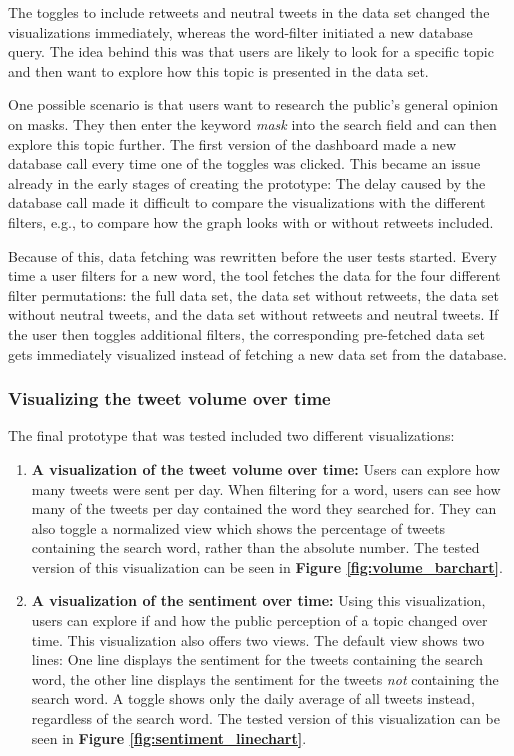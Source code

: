 The toggles to include retweets and neutral tweets in the data set changed the visualizations immediately, whereas the word-filter initiated a new database query. The idea behind this was that users are likely to look for a specific topic and then want to explore how this topic is presented in the data set.

One possible scenario is that users want to research the public's general opinion on masks. They then enter the keyword \emph{mask} into the search field and can then explore this topic further. The first version of the dashboard made a new database call every time one of the toggles was clicked. This became an issue already in the early stages of creating the prototype: The delay caused by the database call made it difficult to compare the visualizations with the different filters, e.g., to compare how the graph looks with or without retweets included.

Because of this, data fetching was rewritten before the user tests started. Every time a user filters for a new word, the tool fetches the data for the four different filter permutations: the full data set, the data set without retweets, the data set without neutral tweets, and the data set without retweets and neutral tweets. If the user then toggles additional filters, the corresponding pre-fetched data set gets immediately visualized instead of fetching a new data set from the database.

\subsubsection{Visualizing the tweet volume over time}
The final prototype that was tested included two different visualizations:

\begin{enumerate}
    \item \textbf{A visualization of the tweet volume over time:} Users can explore how many tweets were sent per day. When filtering for a word, users can see how many of the tweets per day contained the word they searched for. They can also toggle a normalized view which shows the percentage of tweets containing the search word, rather than the absolute number. The tested version of this visualization can be seen in \textbf{Figure \ref{fig:volume_barchart}}.
    \item \textbf{A visualization of the sentiment over time:} Using this visualization, users can explore if and how the public perception of a topic changed over time. This visualization also offers two views. The default view shows two lines: One line displays the sentiment for the tweets containing the search word, the other line displays the sentiment for the tweets \emph{not} containing the search word. A toggle shows only the daily average of all tweets instead, regardless of the search word. The tested version of this visualization can be seen in \textbf{Figure \ref{fig:sentiment_linechart}}.
\end{enumerate}


